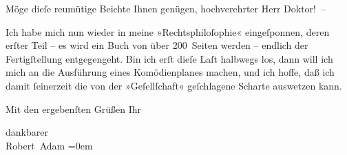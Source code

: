 \pstart
           Möge dieſe reumütige Beichte Ihnen genügen, hochverehrter Herr Doktor! –\pend
           
\pstart
           Ich habe mich nun wieder in meine »Rechtsphiloſophie« eingeſponnen, deren erſter Teil – es wird ein Buch von
               über 200 Seiten werden – endlich der Fertigſtellung entgegengeht. Bin ich erſt dieſe
               Laſt halbwegs los, dann will ich mich an die Ausführung eines Komödienplanes machen,
               und ich hoffe, daß ich damit{ }ſeinerzeit die von der »Geſellſchaft« geſchlagene Scharte auswetzen kann.\pend
           
\pstart
           Mit den ergebenſten Grüßen Ihr\pend
           
\pstart
           dankbarer{\\[\baselineskip]}\spacefill\mbox{Robert Adam}\pend
           \leftskip=0em{}\endnumbering{}  \newcommand{\dateiname}{L02215}\newcommand{\titel}{Robert Adam an Arthur Schnitzler, 16. 7. 1915}\newcommand{\editorInnen}{Martin Anton Müller und Gerd-Hermann Susen}
